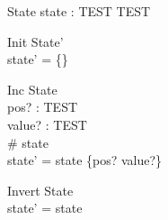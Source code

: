\documentclass[a4paper]{scrartcl}
\begin{document}
\begin{zed}
  [TEST]
\end{zed}

\begin{schema}{State}
  state : TEST \rel TEST
\end{schema}

\begin{schema}{Init}
  State'\\
  \where
  state' = \{\}
\end{schema}

\begin{schema}{Inc}
  \Delta State\\
  pos? : TEST\\
  value? : TEST\\
  \where
  \# state \\
  state' = state \oplus \{pos? \mapsto value?\}
\end{schema}

\begin{schema}{Invert}
  \Delta State\\
  \where
  state' = state \inv\\
\end{schema}
\end{document}
